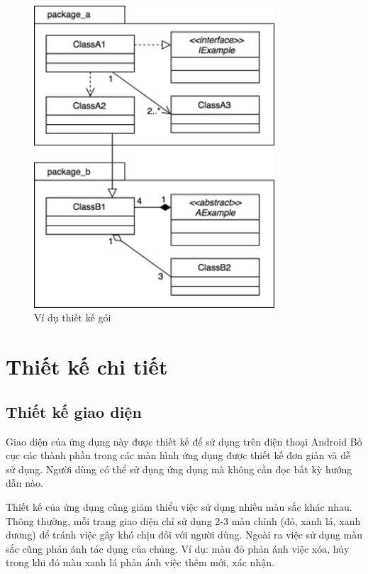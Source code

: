 \documentclass[../DoAn.tex]{subfiles}
\begin{document}
\begin{figure}[H]
    \centering
    \includegraphics[width=0.8\textwidth]{Hinhve/Picture2.png}
    \caption{Ví dụ thiết kế gói}
    \label{fig:Fig2}
\end{figure}

\section{Thiết kế chi tiết}
\subsection{Thiết kế giao diện}

Giao diện của ứng dụng này được thiết kế để sử dụng trên điện thoại Android
Bố cục các thành phần trong các màn hình ứng dụng được thiết kế đơn giản
và dễ sử dụng. Người dùng có thể sử dụng ứng dụng mà không cần đọc bất 
kỳ hướng dẫn nào.

Thiết kế của ứng dụng cũng giảm thiểu việc sử dụng nhiều màu sắc khác nhau.
Thông thường, mỗi trang giao diện chỉ sử dụng 2-3 màu chính (đỏ, xanh lá, xanh dương) 
để tránh việc gây khó chịu đối với người dùng.
Ngoài ra việc sử dụng màu sắc cũng phản ánh tác dụng của chúng. Ví dụ: màu đỏ 
phản ánh việc xóa, hủy trong khi đó màu xanh lá phản ánh việc thêm mới, xác nhận.
\end{document}
